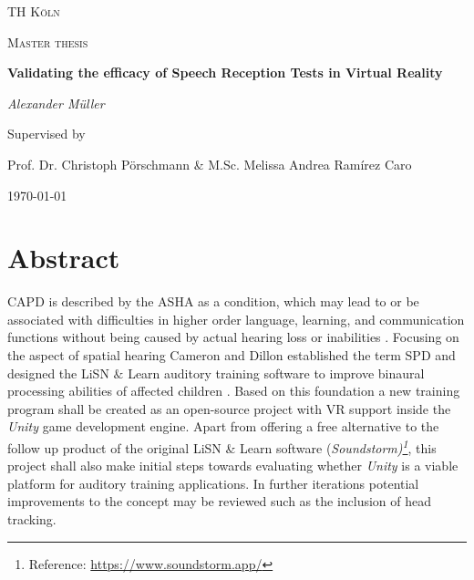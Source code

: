 \documentclass[a4paper,11pt]{article}%
\renewcommand{\\}{\vspace*{0.5\baselineskip} \newline}
\begin{document}
	

\begin{titlepage}
	\centering
	{\scshape\LARGE TH Köln \par}
	\vspace{1cm}
	{\scshape\Large Master thesis\par}
	\vspace{1.5cm}
	{\huge\bfseries Validating the efficacy of Speech Reception Tests in Virtual Reality\par}
	\vspace{2cm}
	{\Large\itshape Alexander Müller \par}
	\vfill
	Supervised by\par
    \par Prof. Dr. Christoph Pörschmann 	\&  M.Sc. Melissa Andrea Ramírez Caro \par
	\vfill

	{\large \today\par}
\end{titlepage}


\newpage

\tableofcontents
\newpage



\section*{Abstract}
\ac{CAPD} is described by the \ac{ASHA} as a condition, which \dq may lead to or be associated with difficulties in higher order language, learning, and communication functions\dq{} without being caused by actual hearing loss or inabilities \cite{ASHA}. Focusing on the aspect of spatial hearing Cameron and Dillon established the term \ac{SPD} and designed the \ac{LiSN} $\&$ Learn auditory training software to improve binaural processing abilities of affected children \cite{LiSN-dev}.
\newline
\newline
Based on this foundation a new training program shall be created as an open-source project with \ac{VR} support inside the \textit{Unity} game development engine.
Apart from offering a free alternative to the follow up product of the original \ac{LiSN} \& Learn software (\textit{Soundstorm)\footnote{Reference: \url{https://www.soundstorm.app/}}}, this project shall also make initial steps towards evaluating whether \textit{Unity} is a viable platform for auditory training applications. In further iterations potential improvements to the concept may be reviewed such as the inclusion of head tracking.
\end{document}
